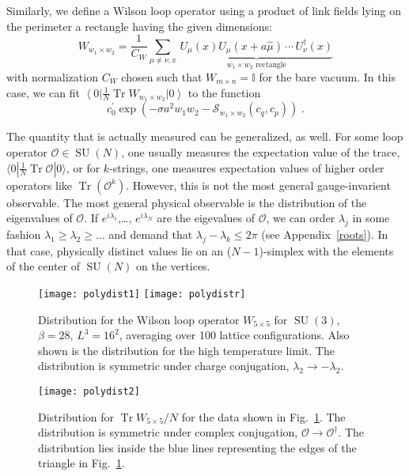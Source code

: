\documentclass[preprint,aps,prd]{revtex4-2}
\newcommand{\be}{\begin{equation}}
\newcommand{\eq}{\end{equation}}
\DeclareMathOperator{\SU}{SU}
\DeclareMathOperator{\Tr}{Tr}
\begin{document}
Similarly, we define a Wilson loop operator using a product of
link fields lying on the perimeter a rectangle having the given
dimensions:
\be
       W_{w_1\times w_2} = \frac{1}{C_W} \sum_{\mu \ne \nu, x}\,
         \underbrace{U_\mu(x) U_\mu(x+a \hat{\mu}) \,\cdots\, U_\nu^\dagger (x)
         }_{\mbox{$w_1\times w_2$ rectangle}}
\eq
with normalization $C_W$ chosen such that $W_{m\times n} = \mathbb{I}$
for the bare vacuum.  In this case, we can fit $\left\langle 0 \right|
\frac{1}{N} \Tr W_{w_1\times w_2} \left|0\right\rangle $ to the function
\be
     c_0^\prime \exp\left(
     -\sigma a^2 w_1 w_2 - \mathcal{S}_{w_1\times w_2}\left(c_q, c_p\right)
     \right)  \; .  \label{wfit}
\eq

The quantity that is actually measured can be generalized, as well.
For some loop operator $\mathcal{O}\in\SU(N)$, one usually
measures the expectation value of the trace,
$\langle 0 | \frac{1}{N} \Tr \mathcal{O} |0\rangle$, or for $k$-strings,
one measures expectation values of higher order operators
like $\Tr\left( \mathcal{O}^k\right)$.
However, this is not the most general gauge-invarient observable.
The most general physical observable is the distribution of the
eigenvalues of $\mathcal{O}$.  If $e^{i\lambda_1}$,\ldots, $e^{i\lambda_N}$
are the eigevalues of $\mathcal{O}$, we can order $\lambda_j$ in
some fashion $\lambda_1\ge \lambda_2 \ge \ldots$ and demand that
$\lambda_j-\lambda_k\le 2\pi$ (see Appendix~\ref{roots}).
In that case, physically
distinct values lie on an ($N-1$)-simplex with the elements of the
center of $\SU(N)$ on the vertices.

\begin{figure}
  \texttt{[image: polydist1]}
  \texttt{[image: polydistr]}
  \caption{Distribution for the Wilson loop operator
    $W_{5\times 5}$ for $\SU(3)$, $\beta=28$, $L^3=16^2$,
    averaging over 100 lattice configurations.
    Also shown is the distribution for the high temperature
    limit.  The distribution is
    symmetric under charge conjugation,
    $\lambda_2 \to -\lambda_2$.
   \label{polydist1}}
\end{figure}
\begin{figure}
  \texttt{[image: polydist2]}
  \caption{Distribution for $\Tr W_{5\times 5}/N$  for
    the data shown in Fig.~\ref{polydist1}.  
    The distribution is symmetric under complex conjugation,
    $\mathcal{O}\to\mathcal{O}^\dagger$.
    The distribution lies inside the blue lines representing
    the edges of the triangle in Fig.~\ref{polydist1}.
    \label{polydist2}}
\end{figure}
\end{document}
